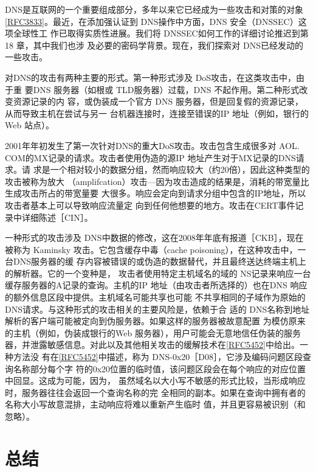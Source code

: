 DNS是互联网的一个重要组成部分，多年以来它已经成为一些攻击和对策的对象
\href{https://www.rfc-editor.org/rfc/rfc3833}{[RFC3833]}。最近，在添加强认证到 DNS操作中方面，DNS 安全（DNSSEC）这项全球性工
作已取得实质性进展。我们将 DNSSEC如何工作的详细讨论推迟到第18 章，其中我们也涉
及必要的密码学背景。现在，我们探索对 DNS已经发动的一些攻击。

对DNS的攻击有两种主要的形式。第一种形式涉及 DoS攻击，在这类攻击中，由于重
要DNS 服务器（如根或 TLD服务器）过载，DNS 不起作用。第二种形式改变资源记录的内
容，或伪装成一个官方 DNS 服务器，但是回复假的资源记录，从而导致主机在尝试与另一
台机器连接时，连接至错误的IP 地址（例如，银行的Web 站点）。

2001年年初发生了第一次针对DNS的重大DoS攻击。攻击包含生成很多对 AOL.
COM的MX记录的请求。攻击者使用伪造的源IP 地址产生对于MX记录的DNS请求。请
求是一个相对较小的数据分组，然而响应较大（约20倍），因此这种类型的攻击被称为放大
（amplifcation）攻击—因为攻击造成的结果是，消耗的带宽量比生成攻击所占的带宽量要
大很多。响应会定向到请求分组中包含的IP地址，所以攻击者基本上可以导致响应流量定
向到任何他想要的地方。攻击在CERT事件记录中详细陈述［CIN］。

一种形式的攻击涉及 DNS中数据的修改，这在2008年年底有报道［CKB］，现在被称为
Kaminsky 攻击。它包含缓存中毒（cache poisoning），在这种攻击中，一台DNS服务器的缓
存内容被错误的或伪造的数据替代，并且最终送达终端主机上的解析器。它的一个变种是，
攻击者使用特定主机域名的域的 NS记录来响应一台缓存服务器的A记录的查询。主机的IP
地址（由攻击者所选择的）也在DNS 响应的额外信息区段中提供。主机域名可能共享也可能
不共享相同的子域作为原始的 DNS请求。与这种形式的攻击相关的主要风险是，依赖于合
适的 DNS名称到地址解析的客户端可能被定向到伪服务器。如果这样的服务器被故意配置
为模仿原来的主机（例如，伪装成银行的Web 服务器），用户可能会无意地信任伪装的服务
器，并泄露敏感信息。对此以及其他相关攻击的缓解技术在\href{https://www.rfc-editor.org/rfc/rfc5452}{[RFC5452]}中给出。一种方法没
有在\href{https://www.rfc-editor.org/rfc/rfc5452}{[RFC5452]}中描述，称为 DNS-0x20［D08］，它涉及编码问题区段查询名称部分每个字
符的0x20位置的临时值，该问题区段会在每个响应的对应位置中回显。这成为可能，因为，
虽然域名以大小写不敏感的形式比较，当形成响应时，服务器往往会返回一个查询名称的完
全相同的副本。如果在查询中拥有者的名称大小写故意混排，主动响应将难以重新产生临时
值，并且更容易被识别（和忽略）。

\section{总结}

